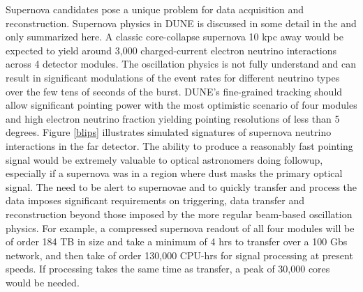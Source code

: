 Supernova candidates pose a unique problem for data acquisition and reconstruction.  Supernova physics in DUNE is discussed in some detail in the \cite{ Abi:2020evt} and only summarized here. A classic core-collapse supernova 10 kpc away would be expected to yield around 3,000  charged-current electron neutrino interactions across 4 detector modules.  The oscillation physics is not fully understand and can result in significant modulations of the event rates for different neutrino types  over the few tens of seconds of the burst.  DUNE's fine-grained tracking should allow significant pointing power with the most optimistic scenario of four modules and high electron neutrino fraction yielding pointing resolutions of less than 5 degrees.   Figure \ref{blips} illustrates simulated signatures of supernova neutrino interactions in the far detector. The ability to produce a reasonably fast pointing signal would be extremely valuable to optical astronomers doing followup, especially if a supernova was in a region where dust masks the primary optical signal.   The need to be alert to supernovae and to quickly transfer and process the data imposes significant requirements on triggering, data transfer and reconstruction beyond those imposed by the more regular beam-based oscillation physics.   For example, a compressed supernova readout of all four modules will be of order 184 TB in size and take a minimum of 4 hrs to transfer over a 100 Gbs network,  and then take of order 130,000 CPU-hrs for signal processing at present speeds.  If processing takes the same time as transfer, a peak of 30,000 cores would be needed. 



